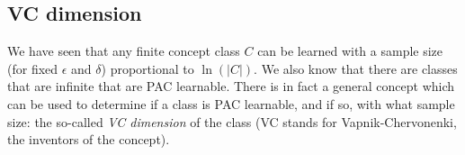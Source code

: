 \documentclass{article}
\newcommand{\calA}{\mathcal{A}}
\newcommand{\abs}[1]{\vert #1 \vert}
\newcommand{\one}{\mathds{1}}
\begin{document}
 

\subsection{VC dimension}
We have seen that any finite concept class $C$ can be learned with a sample size (for fixed $\epsilon$ and $\delta$) proportional to $\ln(\abs{C})$. We also know that there are classes that are infinite that are PAC learnable. There is in fact a general concept which can be used to determine if a class is PAC learnable, and if so, with what sample size: the so-called \emph{VC dimension} of the class (VC stands for Vapnik-Chervonenki, the inventors of the concept).
\end{document}
